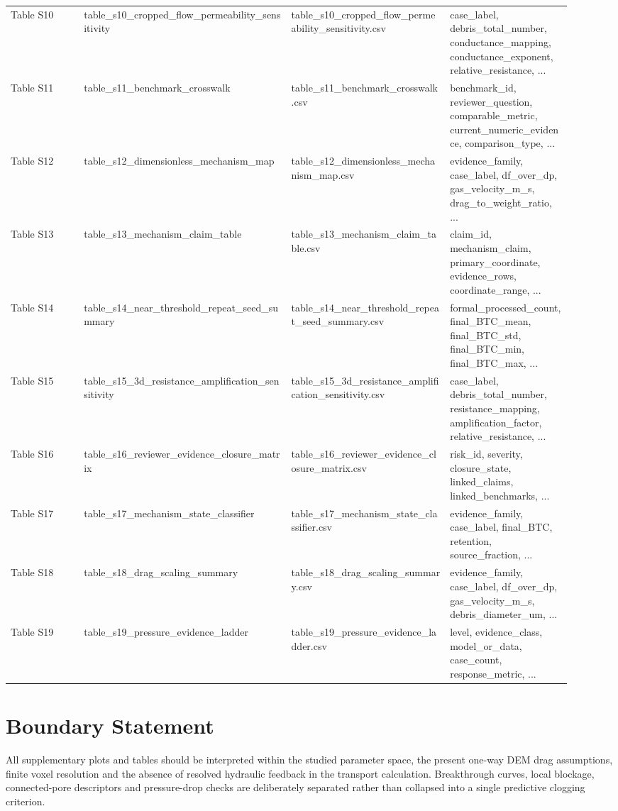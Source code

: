 \documentclass[11pt]{article}
\begin{document}
\begin{longtable}{P{0.12\linewidth}P{0.34\linewidth}P{0.26\linewidth}P{0.20\linewidth}}
Table S10 & table\_s10\_cropped\_flow\_permeability\_sensitivity & table\_s10\_cropped\_flow\_permeability\_sensitivity.csv & case\_label, debris\_total\_number, conductance\_mapping, conductance\_exponent, relative\_resistance, ... \\
Table S11 & table\_s11\_benchmark\_crosswalk & table\_s11\_benchmark\_crosswalk.csv & benchmark\_id, reviewer\_question, comparable\_metric, current\_numeric\_evidence, comparison\_type, ... \\
Table S12 & table\_s12\_dimensionless\_mechanism\_map & table\_s12\_dimensionless\_mechanism\_map.csv & evidence\_family, case\_label, df\_over\_dp, gas\_velocity\_m\_s, drag\_to\_weight\_ratio, ... \\
Table S13 & table\_s13\_mechanism\_claim\_table & table\_s13\_mechanism\_claim\_table.csv & claim\_id, mechanism\_claim, primary\_coordinate, evidence\_rows, coordinate\_range, ... \\
Table S14 & table\_s14\_near\_threshold\_repeat\_seed\_summary & table\_s14\_near\_threshold\_repeat\_seed\_summary.csv & formal\_processed\_count, final\_BTC\_mean, final\_BTC\_std, final\_BTC\_min, final\_BTC\_max, ... \\
Table S15 & table\_s15\_3d\_resistance\_amplification\_sensitivity & table\_s15\_3d\_resistance\_amplification\_sensitivity.csv & case\_label, debris\_total\_number, resistance\_mapping, amplification\_factor, relative\_resistance, ... \\
Table S16 & table\_s16\_reviewer\_evidence\_closure\_matrix & table\_s16\_reviewer\_evidence\_closure\_matrix.csv & risk\_id, severity, closure\_state, linked\_claims, linked\_benchmarks, ... \\
Table S17 & table\_s17\_mechanism\_state\_classifier & table\_s17\_mechanism\_state\_classifier.csv & evidence\_family, case\_label, final\_BTC, retention, source\_fraction, ... \\
Table S18 & table\_s18\_drag\_scaling\_summary & table\_s18\_drag\_scaling\_summary.csv & evidence\_family, case\_label, df\_over\_dp, gas\_velocity\_m\_s, debris\_diameter\_um, ... \\
Table S19 & table\_s19\_pressure\_evidence\_ladder & table\_s19\_pressure\_evidence\_ladder.csv & level, evidence\_class, model\_or\_data, case\_count, response\_metric, ... \\
\bottomrule
\end{longtable}
\section*{Boundary Statement}
All supplementary plots and tables should be interpreted within the studied parameter space, the present one-way DEM drag assumptions, finite voxel resolution and the absence of resolved hydraulic feedback in the transport calculation. Breakthrough curves, local blockage, connected-pore descriptors and pressure-drop checks are deliberately separated rather than collapsed into a single predictive clogging criterion.
\end{document}
